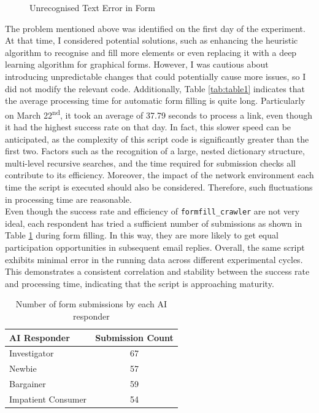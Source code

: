 \documentclass[ oneside,%
                    author={Cassie Qing Tang},
                    degree={BSc},
                     title={An Automated Response System for Disrupting Online Pet Scamming \\ },
                    subtitle={ }]{dissertation}
\begin{document}
\begin{figure}[H]
\begin{minipage}{0.45\textwidth}
        \caption{Unrecognised Text Error in Form}
        \label{fig:pic11}
    \end{minipage}
\end{figure}

The problem mentioned above was identified on the first day of the experiment. At that time, I considered potential solutions, such as enhancing the heuristic algorithm to recognise and fill more elements or even replacing it with a deep learning algorithm for graphical forms. However, I was cautious about introducing unpredictable changes that could potentially cause more issues, so I did not modify the relevant code. Additionally, Table \ref{tab:table1} indicates that the average processing time for automatic form filling is quite long. Particularly on March 22\textsuperscript{nd}, it took an average of 37.79 seconds to process a link, even though it had the highest success rate on that day. In fact, this slower speed can be anticipated, as the complexity of this script code is significantly greater than the first two. Factors such as the recognition of a large, nested dictionary structure, multi-level recursive searches, and the time required for submission checks all contribute to its efficiency. Moreover, the impact of the network environment each time the script is executed should also be considered. Therefore, such fluctuations in processing time are reasonable.
\\

Even though the success rate and efficiency of \texttt{formfill\_crawler} are not very ideal, each respondent has tried a sufficient number of submissions as shown in Table \ref{tab:table2} during form filling. In this way, they are more likely to get equal participation opportunities in subsequent email replies. Overall, the same script exhibits minimal error in the running data across different experimental cycles. This demonstrates a consistent correlation and stability between the success rate and processing time, indicating that the script is approaching maturity.
\begin{table}[ht]
\centering
\begin{tabular}{@{}lc@{}}
\toprule
\textbf{AI Responder} & \textbf{Submission Count} \\
\midrule
Investigator & 67 \\
Newbie & 57 \\
Bargainer & 59 \\
Impatient Consumer & 54 \\
\bottomrule
\end{tabular}
\caption{Number of form submissions by each AI responder}
\label{tab:table2}
\end{table}
\end{document}
